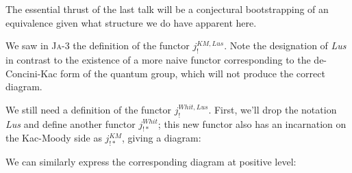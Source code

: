 \documentclass[12pt]{amsart}
\newcommand\Ja[1]{\textsc{Ja}-#1}
\newcommand\Gr{\mathbf{Gr}}
\newcommand\KL{\mathbf{KL}}
\newcommand\Whit{\mathbf{Whit}}
\newcommand\neglv{-\kappa}
\newcommand\poslv{\kappa}
\newcommand\dneglv{-\check{\kappa}}
\newcommand\dposlv{\check{\kappa}}
\begin{document}
  The essential thrust of the last talk will be a conjectural bootstrapping of
  an equivalence given what structure we do have apparent here.

  \begin{rmk}
    We saw in \Ja{3} the definition of the functor $j_!^{KM,Lus}$. Note the
    designation of \textit{Lus} in contrast to the existence of a more naive
    functor corresponding to the de-Concini-Kac form of the quantum group, which
    will not produce the correct diagram. %
  \end{rmk}


  We still need a definition of the functor $j_!^{Whit,Lus}$. First, we'll drop
  the notation \textit{Lus}\footnotemark{} and define another functor
  $j_{!*}^{Whit}$; this new functor also
  has an incarnation on the Kac-Moody side as $j_{!*}^{KM}$, giving a diagram:


  We can similarly express the corresponding diagram at positive level:

\end{document}
